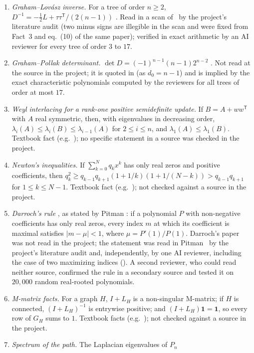 \documentclass[11pt]{amsart}
\theoremstyle{definition}
\theoremstyle{remark}
\begin{document}
\begin{enumerate}
\item[(GL)] \emph{Graham--Lov\'asz inverse.} For a tree of order $n\ge2$,
$D^{-1}=-\tfrac12L+\tau\tau^{\mathsf T}/(2(n-1))$ \cite[Lemma~1, p.~66]{GL78}.
Read in a scan of~\cite{GL78} by the project's literature audit (two minus
signs are illegible in the scan and were fixed from Fact~3 and eq.~(10) of
the same paper); verified in exact arithmetic by an AI reviewer for every
tree of order $3$ to $17$.
\item[(GP)] \emph{Graham--Pollak determinant.}
$\det D=(-1)^{n-1}(n-1)2^{n-2}$ \cite{GP71}. Not read at the source in the
project; it is quoted in \cite{AAB} (as $d_0=n-1$) and is implied by the
exact characteristic polynomials computed by the reviewers for all trees of
order at most $17$.
\item[(W)] \emph{Weyl interlacing for a rank-one positive semidefinite
update.} If $B=A+ww^{\mathsf T}$ with $A$ real symmetric, then, with
eigenvalues in decreasing order, $\lambda_i(A)\le\lambda_i(B)\le\lambda_{i-1}(A)$
for $2\le i\le n$, and $\lambda_1(A)\le\lambda_1(B)$. Textbook fact (e.g.\
\cite{HJ}); no specific statement in a source was checked in the project.
\item[(N)] \emph{Newton's inequalities.} If $\sum_{k=0}^Nq_kx^k$ has only real
zeros and positive coefficients, then
$q_k^2\ge q_{k-1}q_{k+1}(1+1/k)(1+1/(N-k))>q_{k-1}q_{k+1}$ for $1\le k\le N-1$.
Textbook fact (e.g.\ \cite{HLP}); not checked against a source in the
project.
\item[(D)] \emph{Darroch's rule} \cite[Theorem~4]{Dar64}, as stated by Pitman
\cite[p.~284]{Pit97}: if a polynomial $P$ with non-negative coefficients has
only real zeros, every index $m$ at which its coefficient is maximal
satisfies $|m-\mu|<1$, where $\mu=P'(1)/P(1)$. Darroch's paper was not read
in the project; the statement was read in Pitman~\cite{Pit97} by the
project's literature audit and, independently, by one AI reviewer, including
the case of two maximizing indices (\cite[eq.~(13)]{Pit97}). A second
reviewer, who could read neither source, confirmed the rule in a secondary
source and tested it on $20{,}000$ random real-rooted polynomials.
\item[(M)] \emph{M-matrix facts.} For a graph $H$, $I+L_H$ is a non-singular
M-matrix; if $H$ is connected, $(I+L_H)^{-1}$ is entrywise positive; and
$(I+L_H)\mathbf 1=\mathbf 1$, so every row of $G_H$ sums to $1$. Textbook
facts (e.g.\ \cite{BP}); not checked against a source in the project.
\item[(PS)] \emph{Spectrum of the path.} The Laplacian eigenvalues of $P_n$

\end{enumerate}
\end{document}
